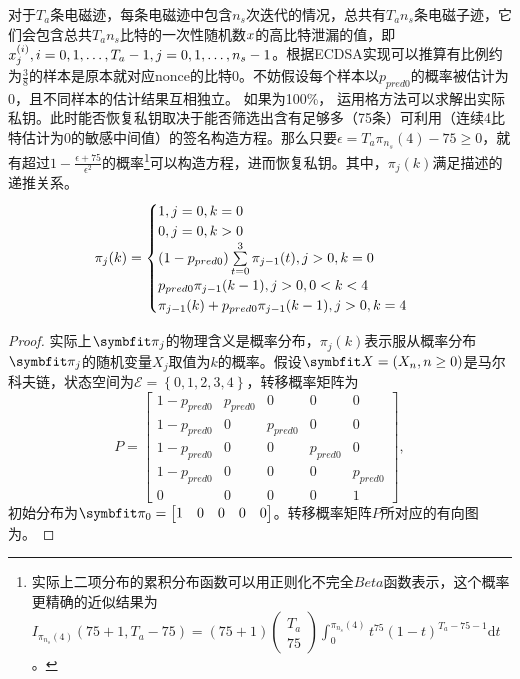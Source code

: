{	\begin{proposition}\label{prop:highalpha}
		对于$T_a$条电磁迹，每条电磁迹中包含$n_s$次迭代的情况，总共有$T_an_s$条电磁子迹，它们会包含总共$T_an_s$比特的一次性随机数$x$的高比特泄漏的值，即$x^{(i)}_j,i=0,1,\dots,T_a-1,j=0,1,\dots,n_s-1$。根据ECDSA实现可以推算有比例约为$\frac38$的样本是原本就对应nonce的比特0。不妨假设每个样本以$p_{pred0}$的概率被估计为0，且不同样本的估计结果互相独立。
		如果\zyx 为100\%，
		运用格方法可以求解出实际私钥。此时能否恢复私钥取决于能否筛选出含有足够多（75条）可利用（连续4比特估计为0的敏感中间值）的签名构造方程。那么只要$\epsilon=T_a\pi_{n_s}(4)-75\ge0$，就有超过$1-\frac{\epsilon+75}{\epsilon^2}$的概率\footnote{实际上二项分布的累积分布函数可以用正则化不完全$Beta$函数表示，这个概率更精确的近似结果为$I_{\pi_{n_s}(4)}(75+1,T_a-75)=(75+1)\begin{pmatrix}T_a\\75\end{pmatrix}\int_0^{\pi_{n_s}(4)}t^{75}(1-t)^{T_a-75-1}\mathrm dt$。}可以构造方程，进而恢复私钥。其中，$\pi_{j}(k)$满足描述的递推关系。
		\begin{equation}\label{eq:recursion}
			\pi_{j}(k)=\begin{cases}
				1,j=0,k=0\\
				0,j=0,k>0\\
				(1-p_{pred0})\sum\limits_{t=0}^{3}\pi_{j-1}(t),j>0,k=0\\
				p_{pred0}\pi_{j-1}(k-1),j>0,0<k<4\\
				\pi_{j-1}(k)+p_{pred0}\pi_{j-1}(k-1),j>0,k=4
			\end{cases}\\
		\end{equation}
	\end{proposition}
	\begin{proof}
	实际上$\Vector{\pi_j}$的物理含义是概率分布，$\pi_j(k)$表示服从概率分布$\Vector\pi_j$的随机变量$X_j$取值为$k$的概率。假设$\Vector X=(X_n,n\ge0)$是马尔科夫链，状态空间为$\mathcal E=\left\lbrace 0,1,2,3,4\right\rbrace $，转移概率矩阵为$$P=\begin{bmatrix}
	1-p_{pred0}&p_{pred0}&0&0&0\\
	1-p_{pred0}&0&p_{pred0}&0&0\\
	1-p_{pred0}&0&0&p_{pred0}&0\\
	1-p_{pred0}&0&0&0&p_{pred0}\\
	0&0&0&0&1
	\end{bmatrix},$$初始分布为$\Vector\pi_0=\begin{bmatrix}
	1&0&0&0&0
	\end{bmatrix}$。转移概率矩阵$P$所对应的有向图为。
	

\end{proof}}
